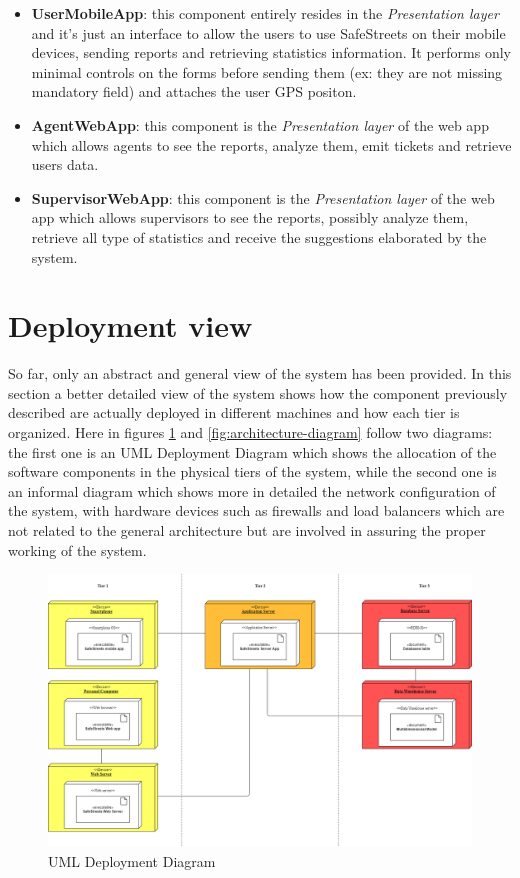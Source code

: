 \documentclass[a4paper]{report}
\begin{document}
\begin{itemize}
\item \textbf{UserMobileApp}: this component entirely resides in the \textit{Presentation layer} and it's just an interface to allow the users to use SafeStreets on their mobile devices, sending reports and retrieving statistics information. It performs only minimal controls on the forms before sending them (ex: they are not missing mandatory field) and attaches the user GPS positon.

\item \textbf{AgentWebApp}: this component is the \textit{Presentation layer} of the web app which allows agents to see the reports, analyze them, emit tickets and retrieve users data.

\item \textbf{SupervisorWebApp}: this component is the \textit{Presentation layer} of the web app which allows supervisors to see the reports, possibly analyze them, retrieve all type of statistics and receive the suggestions elaborated by the system. 



\end{itemize}

\section{Deployment view}

So far, only an abstract and general view of the system has been provided. In this section a better detailed view of the system shows how the component previously described are actually deployed in different machines and how each tier is organized.
Here in figures \ref{fig:deployment-diagram} and \ref{fig:architecture-diagram} follow two diagrams: the first one is an UML Deployment Diagram which shows the allocation of the software components in the physical tiers of the system, while the second one is an informal diagram which shows more in detailed the network configuration of the system, with hardware devices such as firewalls and load balancers which are not related to the general architecture but are involved in assuring the proper working of the system. 

\begin{figure}[htp]
\includegraphics[scale=0.3]{DeploymentDiagram}
\caption{UML Deployment Diagram}
\label{fig:deployment-diagram}
\end{figure}
\end{document}

